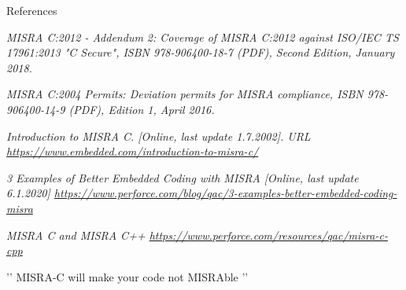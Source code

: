 \documentclass[t]{beamer} %
\begin{document}
\begin{frame}
\begin{block}{References}
\begin{thebibliography}{Per00}
\small{
	\emph{MISRA C:2012 - Addendum 2:  Coverage of MISRA C:2012 against ISO/IEC TS 17961:2013 "C Secure", ISBN 978-906400-18-7 (PDF), Second Edition, January 2018.}
	
	\emph{MISRA C:2004 Permits:  Deviation permits for MISRA compliance, ISBN 978-906400-14-9 (PDF), Edition 1, April 2016.}
	
    \emph{Introduction to MISRA C. [Online, last update 1.7.2002]. URL \url{https://www.embedded.com/introduction-to-misra-c/}}
    
    \emph{3 Examples of Better Embedded Coding with MISRA [Online, last update 6.1.2020] \url{https://www.perforce.com/blog/qac/3-examples-better-embedded-coding-misra}}
    
    \emph{MISRA C and MISRA C++
    \url{https://www.perforce.com/resources/qac/misra-c-cpp}}
}
\end{thebibliography}
\end{block}{}
\end{frame}

\begin{frame}
\vspace{\fill}
    \begin{center}
        \large{
                ’’ MISRA-C will make your code not MISRAble ’’
        }
    \end{center}
\end{frame}
\end{document}
